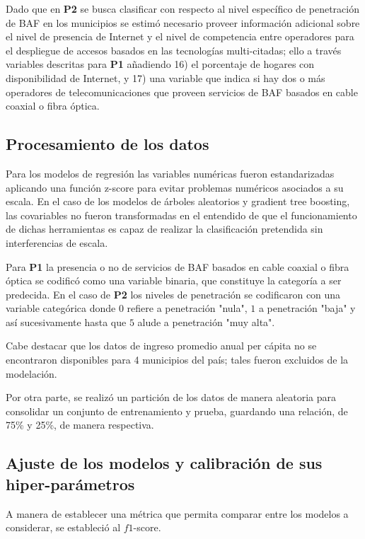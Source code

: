 \documentclass[9pt,twocolumn,twoside]{ilcss}
\begin{document}
Dado que en \textbf{P2} se busca clasificar con respecto al nivel específico de penetración de BAF en los municipios se estimó necesario proveer información adicional sobre el nivel de presencia de Internet y el nivel de competencia entre operadores para el despliegue de accesos basados en las tecnologías multi-citadas; ello a través variables descritas para \textbf{P1} añadiendo 16) el porcentaje de hogares con disponibilidad de Internet, y 17) una variable que indica si hay dos o más operadores de telecomunicaciones que proveen servicios de BAF basados en cable coaxial o fibra óptica. 

\subsection{Procesamiento de los datos}

Para los modelos de regresión las variables numéricas fueron estandarizadas aplicando una función z-score para evitar problemas numéricos asociados a su escala. En el caso de los modelos de árboles aleatorios y gradient tree boosting, las covariables no fueron transformadas en el entendido de que el funcionamiento de dichas herramientas es capaz de realizar la clasificación pretendida sin interferencias de escala. 

Para \textbf{P1} la presencia o no de servicios de BAF basados en cable coaxial o fibra óptica se codificó como una variable binaria, que constituye la categoría a ser predecida. En el caso de \textbf{P2} los niveles de penetración se codificaron con una variable categórica donde $0$ refiere a penetración "nula", $1$ a penetración "baja" y así sucesivamente hasta que $5$ alude a penetración "muy alta".

Cabe destacar que los datos de ingreso promedio anual per cápita no se encontraron disponibles para 4 municipios del país; tales fueron excluidos de la modelación.

Por otra parte, se realizó un partición de los datos de manera aleatoria para consolidar un conjunto de entrenamiento y prueba, guardando una relación, de 75\% y 25\%, de manera respectiva.


\subsection{Ajuste de los modelos y calibración de sus hiper-parámetros}

A manera de establecer una métrica que permita comparar entre los modelos a considerar, se estableció al $f1$-score.
\end{document}

